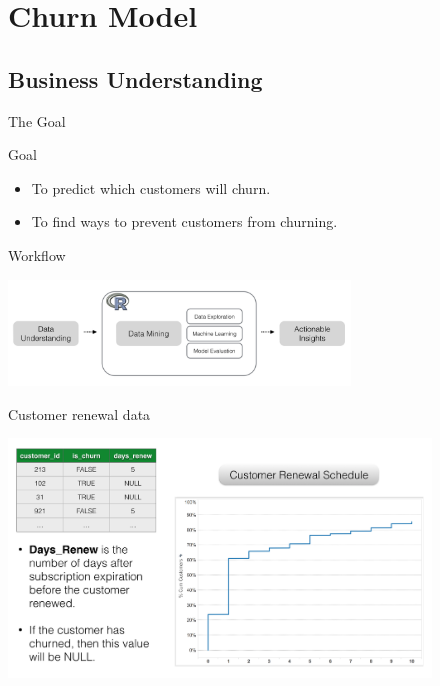 \documentclass[10pt]{beamer}
\begin{document}
\section{Churn Model}

  \subsection{Business Understanding}

      \begin{frame}{The Goal}
        \begin{block}{Goal}
            \begin{itemize}
              \item To predict which customers will churn.
              \item To find ways to prevent customers from churning.
            \end{itemize}
        \end{block}
        \begin{block}{Workflow}
          \begin{center}
            \includegraphics[height=80pt]{../graphs/churnmodel_workflow}
          \end{center}
        \end{block}
      \end{frame}

    \begin{frame}{Customer renewal data}
      \begin{center}
        \includegraphics[height=180pt]{../graphs/datasets_customer_renew}
      \end{center}
    \end{frame}
\end{document}
